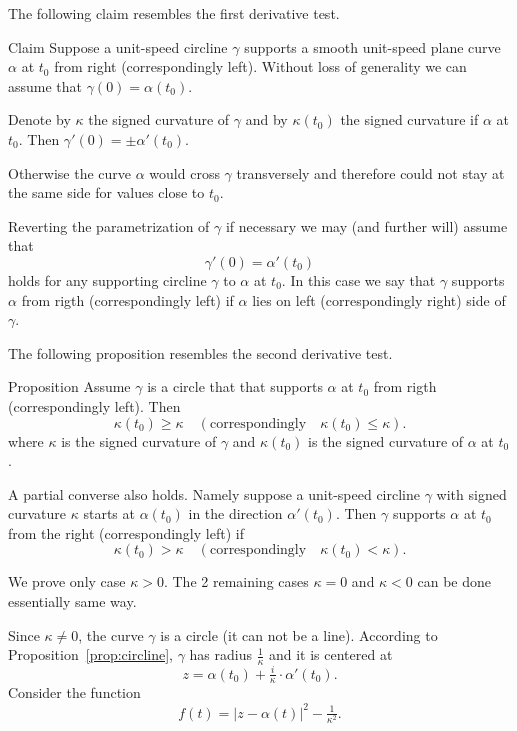 The following claim resembles the first derivative test.

\begin{thm}{Claim}
Suppose a unit-speed circline $\gamma$ supports a smooth unit-speed plane curve $\alpha$ at $t_0$ from right (correspondingly left).
Without loss of generality we can assume that $\gamma(0)=\alpha(t_0)$.

Denote by $\kappa$ the signed curvature of $\gamma$ and by $\kappa(t_0)$ the signed curvature if $\alpha$ at $t_0$. 
Then $\gamma'(0)=\pm\alpha'(t_0)$.
\end{thm}

Otherwise the curve $\alpha$ would cross $\gamma$ transversely and therefore could not stay at the same side for values close to $t_0$.

Reverting the parametrization of $\gamma$ if necessary we may (and further will) assume that 
\[\gamma'(0)=\alpha'(t_0)\]
holds for any supporting circline $\gamma$ to $\alpha$ at $t_0$.
In this case we say that $\gamma$ supports $\alpha$ from rigth (correspondingly left) if $\alpha$ lies on left (correspondingly right) side of $\gamma$.

The following proposition resembles the second derivative test. 

\begin{thm}{Proposition}\label{prop:supporting-circline}
Assume $\gamma$ is a circle that that supports $\alpha$ at $t_0$ from rigth (correspondingly left).  
Then 
\[\kappa(t_0)\ge \kappa
\quad(\text{correspondingly}\quad\kappa(t_0)\le \kappa).
\] 
where $\kappa$ is the signed curvature of $\gamma$ 
and $\kappa(t_0)$ is the signed curvature of $\alpha$ at $t_0$.

A partial converse also holds.
Namely suppose a unit-speed circline $\gamma$ with signed curvature $\kappa$ starts at $\alpha(t_0)$ in the direction $\alpha'(t_0)$.
Then $\gamma$ supports $\alpha$ at $t_0$ from the right (correspondingly left) if 
\[\kappa(t_0)> \kappa
\quad(\text{correspondingly}\quad\kappa(t_0)< \kappa).
\]

\end{thm}

We prove only case $\kappa>0$.
The 2 remaining cases $\kappa=0$ and $\kappa<0$ can be done essentially same way.

Since $\kappa\ne0$, the curve $\gamma$ is a circle (it can not be a line).
According to Proposition~\ref{prop:circline},
$\gamma$ has radius $\tfrac1\kappa$ and it is centered at 
\[z=\alpha(t_0)+\tfrac i\kappa\cdot \alpha'(t_0).\]
Consider the function 
\[f(t)=|z-\alpha(t)|^2-\tfrac1{\kappa^2}.\]

